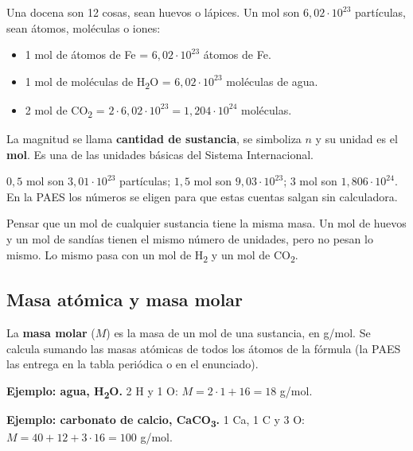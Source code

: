Una docena son 12 cosas, sean huevos o lápices. Un mol son $6{,}02\cdot 10^{23}$ partículas, sean átomos, moléculas o iones:

 
\begin{itemize}
  \item 1 mol de átomos de Fe = $6{,}02\cdot 10^{23}$ átomos de Fe.
  \item 1 mol de moléculas de H\textsubscript{2}O = $6{,}02\cdot 10^{23}$ moléculas de agua.
  \item 2 mol de CO\textsubscript{2} = $2\cdot 6{,}02\cdot 10^{23} = 1{,}204\cdot 10^{24}$ moléculas.
\end{itemize}
  
\begin{clave} La magnitud se llama \textbf{cantidad de sustancia}, se simboliza $n$ y su unidad es el \textbf{mol}. Es una de las unidades básicas del Sistema Internacional.\end{clave}
 
\begin{clave} $0{,}5$ mol son $3{,}01\cdot 10^{23}$ partículas; $1{,}5$ mol son $9{,}03\cdot 10^{23}$; $3$ mol son $1{,}806\cdot 10^{24}$. En la PAES los números se eligen para que estas cuentas salgan sin calculadora.\end{clave}
 
\begin{ojo} Pensar que un mol de cualquier sustancia tiene la misma masa. Un mol de huevos y un mol de sandías tienen el mismo número de unidades, pero no pesan lo mismo. Lo mismo pasa con un mol de H\textsubscript{2} y un mol de CO\textsubscript{2}.\end{ojo}
\subsection{Masa atómica y masa molar}
La \textbf{masa molar} ($M$) es la masa de un mol de una sustancia, en g/mol. Se calcula sumando las masas atómicas de todos los átomos de la fórmula (la PAES las entrega en la tabla periódica o en el enunciado).

 

\textbf{Ejemplo: agua, H\textsubscript{2}O.} 2 H y 1 O: $M = 2\cdot 1 + 16 = 18$ g/mol.

 

\textbf{Ejemplo: carbonato de calcio, CaCO\textsubscript{3}.} 1 Ca, 1 C y 3 O: $M = 40 + 12 + 3\cdot 16 = 100$ g/mol.

 

